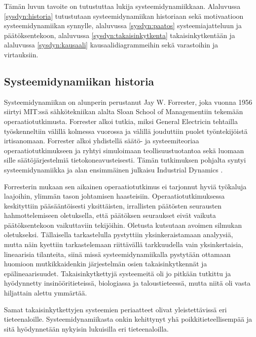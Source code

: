 \documentclass[finnish,12pt,a4paper,pdftex]{article}
\begin{document}
\begin{onehalfspacing}
Tämän luvun tavoite on tutustuttaa lukija systeemidynamiikkaan. Alaluvussa \ref{sysdyn:historia} tutustutaan systeemidynamiikan historiaan sekä motivaatioon systeemidynamiikan synnylle, alaluvussa \ref{sysdyn:paatos} systeemiajatteluun ja päätöksentekoon, alaluvussa \ref{sysdyn:takaisinkytkenta} takaisinkytkentään ja alaluvussa \ref{sysdyn:kausaali} kausaalidiagrammeihin sekä varastoihin ja virtauksiin. %

\subsection{Systeemidynamiikan historia \label{sysdyn:historia}} 


Systeemidynamiikan on alunperin perustanut Jay W. Forrester, joka vuonna 1956 siirtyi MIT:ssä sähkötekniikan alalta Sloan School of Managementiin tekemään operaatiotutkimusta. Forrester alkoi tutkia, miksi General Electricin tehtailla työskenneltiin välillä kolmessa vuorossa ja välillä jouduttiin puolet työntekijöistä irtisanomaan. Forrester alkoi yhdistellä säätö- ja systeemiteoriaa operaatiotutkimukseen ja ryhtyi simuloimaan teollisuustuotantoa sekä luomaan sille säätöjärjestelmiä tietokoneavusteisesti. Tämän tutkimuksen pohjalta syntyi systeemidynamiikka ja alan ensimmäinen julkaisu Industrial Dynamics \cite{Forrester1961}. \cite{Forrester1989} 

Forresterin \cite[s. 398--399]{Forrester1968} mukaan sen aikainen operaatiotutkimus ei tarjonnut hyviä työkaluja laajoihin, ylimmän tason johtamisen haasteisiin. Operaatiotutkimuksessa keskityttiin pääsääntöisesti yksittäisten, irrallisten päätösten seurausten hahmottelemiseen oletuksella, että päätöksen seuraukset eivät vaikuta päätöksentekoon vaikuttaviin tekijöihin. Oletusta kutsutaan avoimen silmukan oletukseksi. Tällaisella tarkastelulla pystyttiin yksinkeraistamaan analyysiä, mutta näin kyettiin tarkastelemaan riittävällä tarkkuudella vain yksinkertaisia, lineaarisia tilanteita, siinä missä systeemidynamiikalla pystytään ottamaan huomioon mutkikkaidenkin järjestelmän osien takaisinkytkennät ja epälineaarisuudet. Takaisinkytkettyjä systeemeitä oli jo pitkään tutkittu ja hyödynnetty insinööritieteissä, biologiassa ja taloustieteessä, mutta niitä oli vasta hiljattain alettu ymmärtää. 

Samat takaisinkytkettyjen systeemien periaatteet olivat yleistettävissä eri tieteenaloille. Systeemidynamiikasta onkin kehittynyt yhä poikkitieteellisempää ja sitä hyödynnetään nykyisin lukuisilla eri tieteenaloilla. \cite{Forrester1968, Sterman2000, WhatIsSystemDynamics} %




\end{onehalfspacing}
\end{document}
